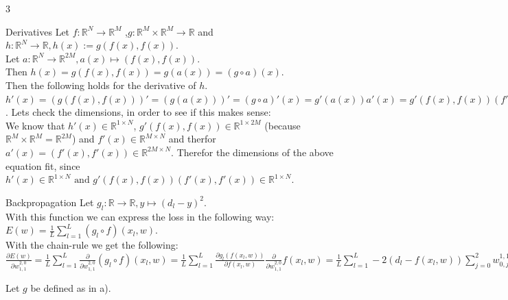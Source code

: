 \documentclass{article}
\begin{document}
    \begin{ukon-infie}[24.12.17]{3}

		
		\begin{exercise}[p=20]{Derivatives}
			Let $f: \mathbb{R}^N \rightarrow\mathbb{R}^M$ ,$g: \mathbb{R}^M \times \mathbb{R}^M \rightarrow \mathbb{R}$ and $h:\mathbb{R}^N \rightarrow \mathbb{R}, h(x) := g(f(x), f(x))$. \\
			
			Let $a: \mathbb{R}^N \rightarrow \mathbb{R}^{2M}, a(x) \mapsto (f(x), f(x))$. \\Then $h(x) = g(f(x), f(x)) = g (a(x)) = (g \circ a)(x)$.\\
			Then the following holds for the derivative of $h$.\\
			
			$h'(x) = (g(f(x), f(x)))' = (g(a(x)))' = (g \circ a)'(x)= g'(a(x))a'(x)= g'(f(x), f(x)) (f'(x), f'(x))$. Lets check the dimensions, in order to see if this makes sense:\\
			
			We know that $h'(x) \in \mathbb{R}^{1\times N}$, $g'(f(x), f(x)) \in \mathbb{R}^{1 \times 2M}$ (because $\mathbb{R}^M \times \mathbb{R}^M = \mathbb{R}^{2M}$) and $f'(x) \in \mathbb{R}^{M \times N}$ and therfor $a'(x) = (f'(x),f'(x)) \in \mathbb{R}^{2M \times N}$. Therefor the dimensions of the above equation fit, since $h'(x) \in \mathbb{R}^{1\times N} \text{ and } g'(f(x), f(x)) (f'(x), f'(x)) \in \mathbb{R}^{1\times N}$.
		\end{exercise}
		
		\begin{exercise}[p=25]{Backpropagation}
		\question{}
		{
			Let $g_l: \mathbb{R} \rightarrow \mathbb{R}, y \mapsto (d_l - y)^2$. \\
			With this function we can express the loss in the following way:\\
			$E(w) = \frac{1}{L} \sum_{l=1}^L (g_l \circ f) (x_l, w)$.\\
			With the chain-rule we get the following:\\
			$\frac{\partial E(w)}{\partial w_{1,1}^{2,0}} = \frac{1}{L} \sum_{l=1}^L \frac{\partial}{\partial w_{1,1}^{2,0}}(g_l \circ f) (x_l, w) = \frac{1}{L} \sum_{l=1}^L \frac{\partial g_l(f(x_l,w))}{\partial f(x_l,w)} \frac{\partial}{\partial w_{1,1}^{2,0}}f(x_l, w)  = \frac{1}{L} \sum_{l=1}^L -2(d_l - f(x_l, w))\sum_{j=0}^2 w_{0,j}^{1,1}x_{l_j}$
		}
		
		\question{}
		{ Let $g$ be defined as in a).\\
		
}
\end{exercise}
\end{ukon-infie}
\end{document}
